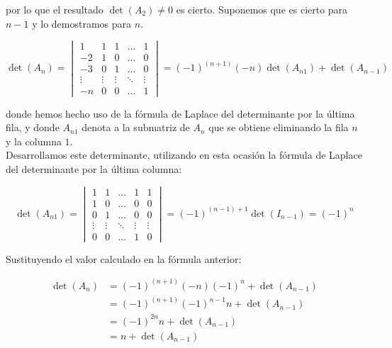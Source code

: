 \begin{itemize}[$\bullet$]
    por lo que el resultado $\det(A_2) \neq 0 $ es cierto. Suponemos que es cierto para $n-1$ y lo demostramos para $n$.

    \begin{equation*}
        \det(A_n) =
        \begin{vmatrix}
            1      & 1      & 1      & \ldots & 1      \\
            -2     & 1      & 0      & \ldots & 0      \\
            -3     & 0      & 1      & \ldots & 0      \\
            \vdots & \vdots & \vdots & \ddots & \vdots \\
            -n     & 0      & 0      & \ldots & 1
        \end{vmatrix}
        = (-1)^{(n+1)}(-n)\det(A_{n1}) + \det(A_{n-1})

    \end{equation*}

    donde hemos hecho uso de la fórmula de Laplace del determinante por la última fila, y donde $A_{n1}$ denota a la submatriz de $A_n$
    que se obtiene eliminando la fila $n$ y la columna $1$.\\

    Desarrollamos este determinante, utilizando en esta ocasión
    la fórmula de Laplace del determinante por la última columna:

    \begin{equation*}
        \det(A_{n1}) =
        \begin{vmatrix}
            1      & 1      & \ldots & 1      & 1      \\
            1      & 0      & \ldots & 0      & 0      \\
            0      & 1      & \ldots & 0      & 0      \\
            \vdots & \vdots & \ddots & \vdots & \vdots \\
            0      & 0      & \ldots & 1      & 0
        \end{vmatrix}
        = (-1)^{(n-1)+1}\det(I_{n-1}) = (-1)^{n}
        
    \end{equation*}

    Sustituyendo el valor calculado en la fórmula anterior:

    \begin{equation*}
        \begin{split}
            \det(A_n)  & = (-1)^{(n+1)}(-n)(-1)^{n} + \det(A_{n-1}) \\
            & = (-1)^{(n+1)}(-1)^{n-1}n + \det(A_{n-1}) \\
            & = (-1)^{2n}n + \det(A_{n-1}) \\
            & = n + \det(A_{n-1})
        \end{split}
    \end{equation*}


\end{itemize}
